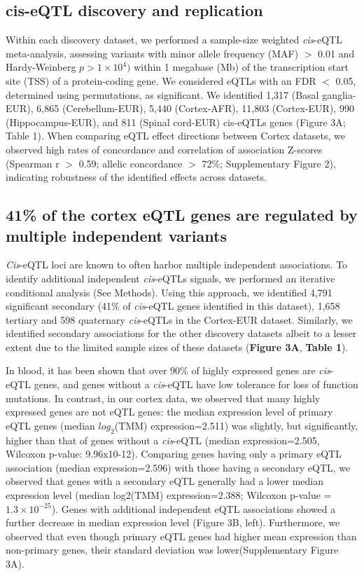 \subsection{cis-eQTL discovery and replication }
Within each discovery dataset, we performed a sample-size weighted \emph{cis}-eQTL meta-analysis, assessing variants with minor allele frequency (MAF) $>$ 0.01 and Hardy-Weinberg $p > 1 \times 10^{4})$ within 1 megabase (Mb) of the transcription start site (TSS) of a protein-coding gene. We considered eQTLs with an FDR $<$ 0.05, determined using permutations, as significant. We identified 1,317 (Basal ganglia-EUR), 6,865 (Cerebellum-EUR), 5,440 (Cortex-AFR), 11,803 (Cortex-EUR), 990 (Hippocampus-EUR), and 811 (Spinal cord-EUR) cis-eQTLs genes (Figure 3A; Table 1). When comparing eQTL effect directions between Cortex datasets, we observed high rates of concordance and correlation of association Z-scores (Spearman r $>$ 0.59; allelic concordance $>$ 72\%; Supplementary Figure 2), indicating robustness of the identified effects across datasets.  

\subsection{41\% of the cortex eQTL genes are regulated by multiple independent variants}
\emph{Cis}-eQTL loci are known to often harbor multiple independent associations\cite{GeneticEffectsGene2017,zhernakovaIdentificationContextdependentExpression2017,vosaUnravelingPolygenicArchitecture2018}. To identify additional independent \emph{cis}-eQTLs signals, we performed an iterative conditional analysis (See Methods). Using this approach, we identified 4,791 significant secondary (41\% of \emph{cis}-eQTL genes identified in this dataset), 1,658 tertiary and 598 quaternary \emph{cis}-eQTLs in the Cortex-EUR dataset. Similarly, we identified secondary associations for the other discovery datasets albeit to a lesser extent due to the limited sample sizes of these datasets (\textbf{Figure 3A}, \textbf{Table 1}).  

In blood, it has been shown that over 90\% of highly expressed genes are \emph{cis}-eQTL genes, and genes without a \emph{cis}-eQTL have low tolerance for loss of function mutations\cite{vosaUnravelingPolygenicArchitecture2018a}. In contrast, in our cortex data, we observed that many highly expressed genes are not eQTL genes: the median expression level of primary eQTL genes (median $log_2$(TMM) expression=2.511) was slightly, but significantly, higher than that of genes without a \emph{cis}-eQTL (median expression=2.505, Wilcoxon p-value: 9.96x10-12). Comparing genes having only a primary eQTL association (median expression=2.596) with those having a secondary eQTL, we observed that genes with a secondary eQTL generally had a lower median expression level (median log2(TMM) expression=2.388; Wilcoxon p-value = $1.3 \times 10^{-25}$). Genes with additional independent eQTL associations showed a further decrease in median expression level (Figure 3B, left). Furthermore, we observed that even though primary eQTL genes had higher mean expression than non-primary genes, their standard deviation was lower(Supplementary Figure 3A). 

